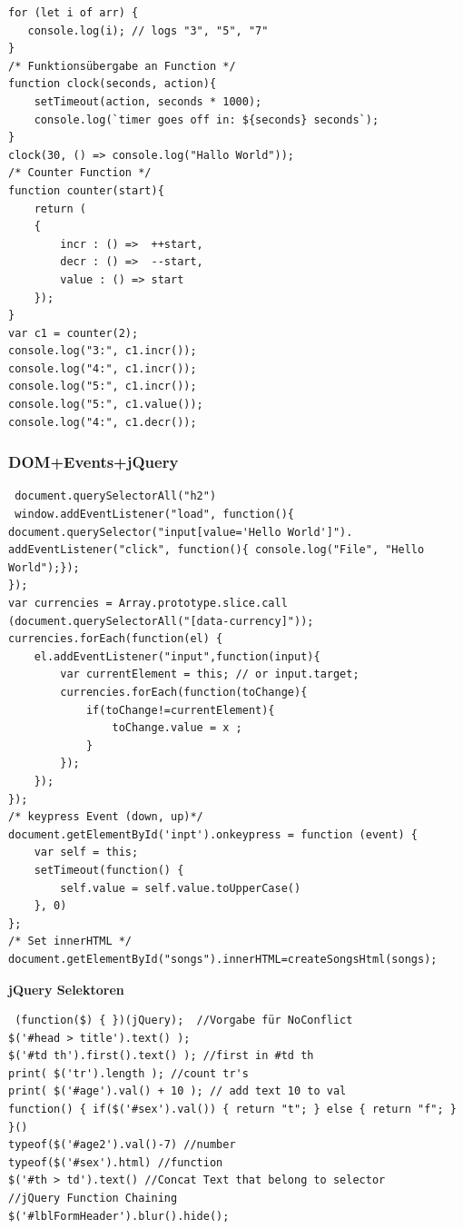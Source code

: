 \begin{multicols*}{4}
\begin{verbatim}
for (let i of arr) {
   console.log(i); // logs "3", "5", "7"
}
/* Funktionsübergabe an Function */
function clock(seconds, action){
    setTimeout(action, seconds * 1000);
    console.log(`timer goes off in: ${seconds} seconds`);
}
clock(30, () => console.log("Hallo World"));
/* Counter Function */
function counter(start){
    return (
    {
        incr : () =>  ++start,
        decr : () =>  --start,
        value : () => start
    });
}
var c1 = counter(2);
console.log("3:", c1.incr());
console.log("4:", c1.incr());
console.log("5:", c1.incr());
console.log("5:", c1.value());
console.log("4:", c1.decr());
 \end{verbatim}

\subsubsection{DOM+Events+jQuery}
 \begin{verbatim}
 document.querySelectorAll("h2")
 window.addEventListener("load", function(){
document.querySelector("input[value='Hello World']").
addEventListener("click", function(){ console.log("File", "Hello World");});
});
var currencies = Array.prototype.slice.call
(document.querySelectorAll("[data-currency]"));
currencies.forEach(function(el) {
    el.addEventListener("input",function(input){
        var currentElement = this; // or input.target;
        currencies.forEach(function(toChange){
            if(toChange!=currentElement){
                toChange.value = x ;
            }
        });
    });
}); 
/* keypress Event (down, up)*/
document.getElementById('inpt').onkeypress = function (event) {
    var self = this;
    setTimeout(function() {
        self.value = self.value.toUpperCase()
    }, 0)
};
/* Set innerHTML */
document.getElementById("songs").innerHTML=createSongsHtml(songs);
\end{verbatim}

\textbf{jQuery Selektoren}

 \begin{verbatim}
 (function($) { })(jQuery);  //Vorgabe für NoConflict
$('#head > title').text() );
$('#td th').first().text() ); //first in #td th
print( $('tr').length ); //count tr's
print( $('#age').val() + 10 ); // add text 10 to val
function() { if($('#sex').val()) { return "t"; } else { return "f"; } }()
typeof($('#age2').val()-7) //number
typeof($('#sex').html) //function
$('#th > td').text() //Concat Text that belong to selector
//jQuery Function Chaining
$('#lblFormHeader').blur().hide();
 \end{verbatim}


\end{multicols*}

